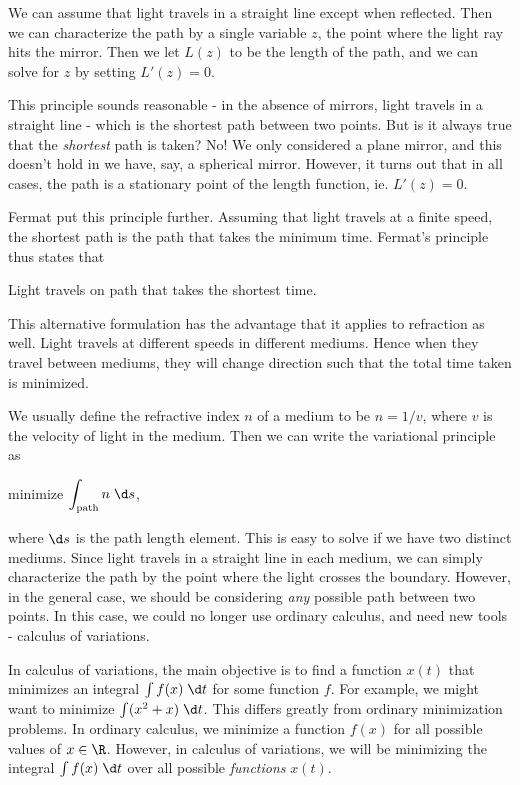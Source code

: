 \documentclass[a4paper]{article}
\begin{document}
We can assume that light travels in a straight line except when reflected. Then we can characterize the path by a single variable $z$, the point where the light ray hits the mirror. Then we let $L(z)$ to be the length of the path, and we can solve for $z$ by setting $L'(z) = 0$.

This principle sounds reasonable - in the absence of mirrors, light travels in a straight line - which is the shortest path between two points. But is it always true that the \emph{shortest} path is taken? No! We only considered a plane mirror, and this doesn't hold in we have, say, a spherical mirror. However, it turns out that in all cases, the path is a stationary point of the length function, ie. $L'(z) = 0$.

Fermat put this principle further. Assuming that light travels at a finite speed, the shortest path is the path that takes the minimum time. Fermat's principle thus states that
\begin{center}
  Light travels on path that takes the shortest time.
\end{center}
This alternative formulation has the advantage that it applies to refraction as well. Light travels at different speeds in different mediums. Hence when they travel between mediums, they will change direction such that the total time taken is minimized.

We usually define the refractive index $n$ of a medium to be $n = 1/v$, where $v$ is the velocity of light in the medium. Then we can write the variational principle as
\begin{center}
  minimize $\displaystyle \int_{\text{path}} n\;\d s$,
\end{center}
where $\d s$ is the path length element. This is easy to solve if we have two distinct mediums. Since light travels in a straight line in each medium, we can simply characterize the path by the point where the light crosses the boundary. However, in the general case, we should be considering \emph{any} possible path between two points. In this case, we could no longer use ordinary calculus, and need new tools - calculus of variations.

In calculus of variations, the main objective is to find a function $x(t)$ that minimizes an integral $\int f(x)\;\d t$ for some function $f$. For example, we might want to minimize $\int (x^2 + x)\;\d t$. This differs greatly from ordinary minimization problems. In ordinary calculus, we minimize a function $f(x)$ for all possible values of $x\in \R$. However, in calculus of variations, we will be minimizing the integral $\int f(x)\;\d t$ over all possible \emph{functions} $x(t)$.
\end{document}
